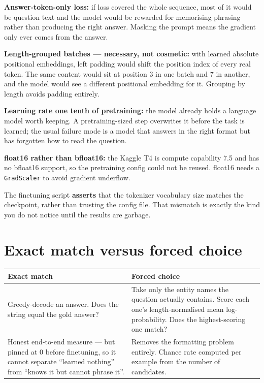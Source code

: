 \documentclass[11pt]{report}
\begin{document}
\begin{deeper}
\textbf{Answer-token-only loss:} if loss covered the whole sequence, most of it
would be question text and the model would be rewarded for memorising phrasing
rather than producing the right answer. Masking the prompt means the gradient
only ever comes from the answer.

\smallskip
\textbf{Length-grouped batches --- necessary, not cosmetic:} with learned
absolute positional embeddings, left padding would shift the position index of
every real token. The same content would sit at position 3 in one batch and 7
in another, and the model would see a different positional embedding for it.
Grouping by length avoids padding entirely.

\smallskip
\textbf{Learning rate one tenth of pretraining:} the model already holds a
language model worth keeping. A pretraining-sized step overwrites it before the
task is learned; the usual failure mode is a model that answers in the right
format but has forgotten how to read the question.

\smallskip
\textbf{float16 rather than bfloat16:} the Kaggle T4 is compute capability 7.5
and has no bfloat16 support, so the pretraining config could not be reused.
float16 needs a \texttt{GradScaler} to avoid gradient underflow.
\end{deeper}

\begin{notebox}
The finetuning script \textbf{asserts} that the tokenizer vocabulary size
matches the checkpoint, rather than trusting the config file. That mismatch is
exactly the kind you do not notice until the results are garbage.
\end{notebox}

\section{Exact match versus forced choice}

\begin{center}\small
\begin{tabular}{p{6.4cm}p{6.4cm}}
\toprule
\textbf{Exact match} & \textbf{Forced choice} \\
\midrule
Greedy-decode an answer. Does the string equal the gold answer? &
Take only the entity names the question actually contains. Score each one's
length-normalised mean log-probability. Does the highest-scoring one match? \\[4pt]
Honest end-to-end measure --- but pinned at 0 before finetuning, so it cannot
separate ``learned nothing'' from ``knows it but cannot phrase it''. &
Removes the formatting problem entirely. Chance rate computed per example from
the number of candidates. \\
\bottomrule
\end{tabular}
\end{center}
\end{document}
